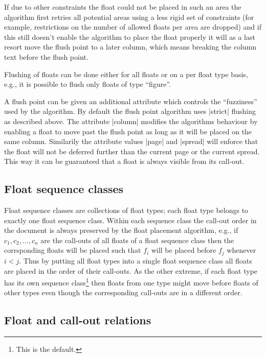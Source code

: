 \documentclass[twocolumn]{article}
\begin{document}
If due to other constraints the float could not be placed in such an
area the algorithm first retries all potential areas using a less
rigid set of constraints (for example, restrictions on the number of
allowed floats per area are dropped) and if this still doesn't enable
the algorithm to place the float properly it will as a last resort
move the flush point to a later column, which means breaking the
column text before the flush point.

Flushing of floats can be done either for all floats or on a
per float type basis, e.g., it is possible to flush only floats of
type ``figure''.

A flush point can be given an additional attribute which controls the
``fuzziness'' used by the algorithm. By default the flush point
algorithm uses |strict| flushing as described above. The attribute
|column| modifies the algorithms behaviour by enabling a float to move
past the flush point as long as it will be placed on the same
column. Similarily the attribute values |page| and |spread| will
enforce that the float will not be deferred further than the current
page or the current spread. This way it can be guaranteed that a float
is always visible from its call-out.


\subsection{Float sequence classes}

Float sequence classes are collections of float types; each float type
belongs to exactly one float sequence class. Within each sequence
class the call-out order in the document is always preserved by the
float placement algorithm, e.g., if $c_1,c_2,\ldots,c_n$ are the
call-outs of all floats of a float sequence class then the
corrsponding floats will be placed such that $f_i$ will be placed
before $f_j$ whenever $i<j$.  Thus by putting all float types into a
single float sequence class all floats are placed in the order of
their call-outs. As the other extreme, if each float type has its own
sequence class\footnote{This is the \LaTeXe{} default.} then floats
from one type might move before floats of other types even though the
corresponding call-outs are in a different order.



\subsection{Float and call-out relations} \label{fl-callout-relations}
\end{document}
